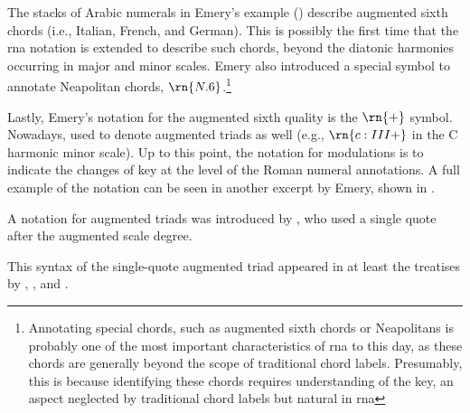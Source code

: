 


The stacks of Arabic numerals in Emery's example
() describe
augmented sixth chords (i.e., Italian, French, and German).
This is possibly the first time that the \gls{rna} notation
is extended to describe such chords, beyond the diatonic
harmonies occurring in major and minor scales. Emery also
introduced a special symbol to annotate Neapolitan chords,
$\rn{N.6}$.\footnote{Annotating special chords, such as
augmented sixth chords or Neapolitans is probably one of the
most important characteristics of \gls{rna} to this day, as
these chords are generally beyond the scope of traditional
chord labels. Presumably, this is because identifying these
chords requires understanding of the key, an aspect
neglected by traditional chord labels but natural in
\gls{rna}}

Lastly, Emery's notation for the augmented sixth quality is
the $\rn{+}$ symbol. Nowadays, used to denote augmented
triads as well (e.g., $\rn{c:III+}$ in the C harmonic minor
scale). Up to this point, the notation for modulations is to
indicate the changes of key at the level of the Roman
numeral annotations. A full example of the notation can be
seen in another excerpt by Emery, shown in
.


A notation for augmented triads was introduced by
\textcite{jadassohn1883lehrbuch}, who used a single quote
after the augmented scale degree.


This syntax of the single-quote augmented triad appeared in
at least the treatises by \textcite{broekhoven1889system},
\textcite{buwa1893schule}, and
\textcite{shepard1896harmony}.

